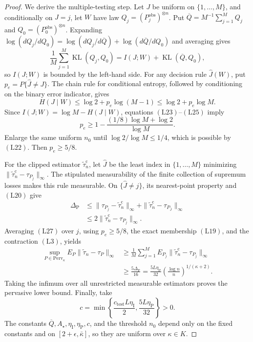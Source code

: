 \documentclass{article}
\begin{document}
\begin{proof}
We derive the multiple-testing step.  Let \(J\) be uniform on
\(\{1,\ldots,M\}\), and conditionally on \(J=j\), let \(W\) have law
\(Q_j=(P_j^{\mathrm{obs}})^{\otimes n}\).  Put
\(\overline Q=M^{-1}\sum_{j=1}^M Q_j\) and
\(Q_0=(P_0^{\mathrm{obs}})^{\otimes n}\).  Expanding
\(\log(dQ_j/dQ_0)=\log(dQ_j/d\overline Q)+
\log(d\overline Q/dQ_0)\) and averaging gives
\[
 \frac1M\sum_{j=1}^M\operatorname{KL}(Q_j,Q_0)
 =I(J;W)+\operatorname{KL}(\overline Q,Q_0),
 \tag{L24}
\]
so \(I(J;W)\) is bounded by the left-hand side.  For any decision rule
\(\widehat J(W)\), put \(p_e=P\{\widehat J\ne J\}\).  The chain rule for conditional entropy, followed by conditioning on the binary error indicator, gives
\[
 H(J\mid W)\leq\log2+p_e\log(M-1)
 \leq\log2+p_e\log M.
 \tag{L25}
\]
Since \(I(J;W)=\log M-H(J\mid W)\), equations
\((\mathrm{L23})\)--\((\mathrm{L25})\) imply
\[
 p_e\geq1-\frac{(1/8)\log M+\log2}{\log M}.
 \tag{L26}
\]
Enlarge the same uniform \(n_0\) until \(\log2/\log M\leq1/4\), which is possible by \((\mathrm{L22})\).  Then \(p_e\geq5/8\).

For the clipped estimator \(\widetilde\tau_n^{\mathrm c}\), let \(\widehat J\) be the least index in \(\{1,\ldots,M\}\) minimizing
\(\|\widetilde\tau_n^{\mathrm c}-\tau_{P_j}\|_\infty\).  The stipulated measurability of the finite collection of supremum losses makes this rule measurable.  On \(\{\widehat J\ne j\}\), its nearest-point property and \((\mathrm{L20})\) give
\[
\begin{aligned}
 \Delta_{\mathrm P}
 &\leq\|\tau_{P_j}-\widetilde\tau_n^{\mathrm c}\|_\infty
      +\|\widetilde\tau_n^{\mathrm c}-\tau_{P_{\widehat J}}\|_\infty\\
 &\leq2\|\widetilde\tau_n^{\mathrm c}-\tau_{P_j}\|_\infty.
\end{aligned}
 \tag{L27}
\]
Averaging \((\mathrm{L27})\) over \(j\), using \(p_e\geq5/8\), the exact membership \((\mathrm{L19})\), and the contraction \((\mathrm{L3})\), yields
\[
\begin{aligned}
 \sup_{P\in\mathrm{Perv}_\kappa}
 E_P\|\widetilde\tau_n-\tau_P\|_\infty
 &\geq\frac1M\sum_{j=1}^M
 E_{P_j}\|\widetilde\tau_n^{\mathrm c}-\tau_{P_j}\|_\infty\\
 &\geq\frac{5\Delta_{\mathrm P}}{16}
 =\frac{5L\eta_{\mathrm P}}{32}
 \left(\frac{\log n}{n}\right)^{1/(\kappa+2)}.
\end{aligned}
 \tag{L28}
\]
Taking the infimum over all unrestricted measurable estimators proves the pervasive lower bound.  Finally, take
\[
 c=\min\left\{
 \frac{c_{\mathrm{test}}L\eta_{\mathrm I}}2,
 \frac{5L\eta_{\mathrm P}}{32}
 \right\}>0.
\]
The constants \(\overline Q,A_\star,\eta_{\mathrm I},\eta_{\mathrm P},c\), and the threshold \(n_0\) depend only on the fixed constants and on
\([2+\epsilon,\bar\kappa]\), so they are uniform over \(\kappa\in K\).
\end{proof}
\end{document}
